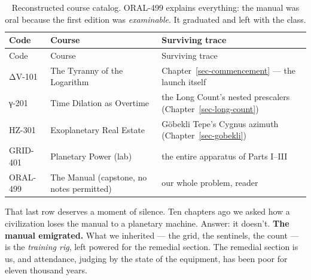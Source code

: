 \documentclass[
  english,
  11pt,
  letterpaper,
]{scrbook}
\begin{document}
\begin{longtable}[]{@{}
  >{\raggedright\arraybackslash}p{}
  >{\raggedright\arraybackslash}p{}
  >{\raggedright\arraybackslash}p{}@{}}
\caption{Reconstructed course catalog. ORAL-499 explains everything: the
manual was oral because the first edition was \emph{examinable}. It
graduated and left with the class.}\label{tbl-syllabus}\tabularnewline
\toprule\noalign{}
\begin{minipage}[b]{\linewidth}\raggedright
Code
\end{minipage} & \begin{minipage}[b]{\linewidth}\raggedright
Course
\end{minipage} & \begin{minipage}[b]{\linewidth}\raggedright
Surviving trace
\end{minipage} \\
\midrule\noalign{}
\endfirsthead
\toprule\noalign{}
\begin{minipage}[b]{\linewidth}\raggedright
Code
\end{minipage} & \begin{minipage}[b]{\linewidth}\raggedright
Course
\end{minipage} & \begin{minipage}[b]{\linewidth}\raggedright
Surviving trace
\end{minipage} \\
\midrule\noalign{}
\endhead
\bottomrule\noalign{}
\endlastfoot
ΔV-101 & The Tyranny of the Logarithm & Chapter~\ref{sec-commencement}
--- the launch itself \\
γ-201 & Time Dilation as Overtime & the Long Count's nested prescalers
(Chapter~\ref{sec-long-count}) \\
HZ-301 & Exoplanetary Real Estate & Göbekli Tepe's Cygnus azimuth
(Chapter~\ref{sec-gobekli}) \\
GRID-401 & Planetary Power (lab) & the entire apparatus of Parts
I--III \\
ORAL-499 & The Manual (capstone, no notes permitted) & our whole
problem, reader \\
\end{longtable}

That last row deserves a moment of silence. Ten chapters ago we asked
how a civilization loses the manual to a planetary machine. Answer: it
doesn't. \textbf{The manual emigrated.} What we inherited --- the grid,
the sentinels, the count --- is the \emph{training rig}, left powered
for the remedial section. The remedial section is us, and attendance,
judging by the state of the equipment, has been poor for eleven thousand
years.
\end{document}
